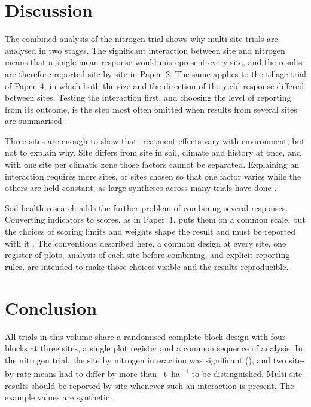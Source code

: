 \section{Discussion}

The combined analysis of the nitrogen trial shows why multi-site trials are
analysed in two stages. The significant interaction between site and nitrogen
means that a single mean response would misrepresent every site, and the
results are therefore reported site by site in Paper~2. The same applies to
the tillage trial of Paper~4, in which both the size and the direction of the
yield response differed between sites. Testing the interaction first, and
choosing the level of reporting from its outcome, is the step most often
omitted when results from several sites are summarised \parencite{gomez1984}.

Three sites are enough to show that treatment effects vary with environment,
but not to explain why. Site differs from site in soil, climate and history at
once, and with one site per climatic zone those factors cannot be separated.
Explaining an interaction requires more sites, or sites chosen so that one
factor varies while the others are held constant, as large syntheses across
many trials have done \parencite{pittelkow2015}.

Soil health research adds the further problem of combining several responses.
Converting indicators to scores, as in Paper~1, puts them on a common scale,
but the choices of scoring limits and weights shape the result and must be
reported with it \parencite{andrews2004,bunemann2018}. The conventions
described here, a common design at every site, one register of plots, analysis
of each site before combining, and explicit reporting rules, are intended to
make those choices visible and the results reproducible.

\section{Conclusion}

All trials in this volume share a randomised complete block design with four
blocks at three sites, a single plot register and a common sequence of
analysis. In the nitrogen trial, the site by nitrogen interaction was
significant (), and two site-by-rate means had to
differ by more than ~\si{\tonne\per\hectare} to be distinguished.
Multi-site results should be reported by site whenever such an interaction is
present. The example values are synthetic.
